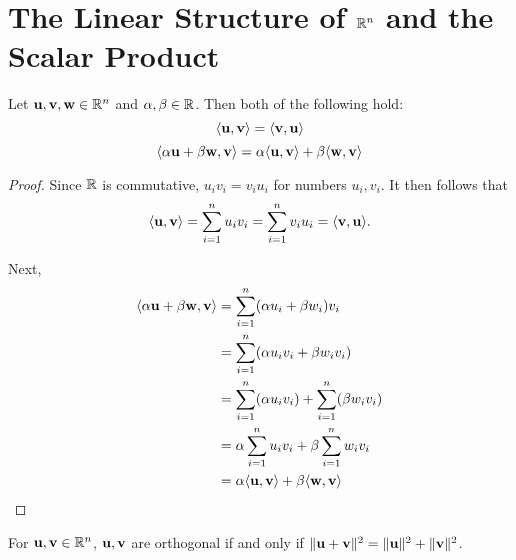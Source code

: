 \documentclass[letterpaper, twoside, 12pt]{book}
\begin{document}
\section{The Linear Structure of \texorpdfstring{$\mathbb R^n$}{Rn}
and the Scalar Product}

\begin{proposition}[10.2]
  Let \(\mathbf u,\mathbf v,\mathbf w\in\mathbb R^n\)
  and \(\alpha,\beta\in\mathbb R\). Then both of the following hold:
  \[
    \langle\mathbf u,\mathbf v\rangle=\langle\mathbf v,\mathbf u\rangle
  \]
  \[
    \langle\alpha\mathbf u+\beta\mathbf w, \mathbf v\rangle
      =
    \alpha\langle\mathbf u,\mathbf v\rangle+\beta\langle\mathbf w,\mathbf v\rangle
  \]
\end{proposition}

\begin{proof}
    Since \(\mathbb R\) is commutative, \(u_i v_i = v_i u_i\) for numbers
    \(u_i, v_i\). It then follows that
    \[ \langle\mathbf u, \mathbf v \rangle = \sum_{i = 1}^n u_i v_i = \sum_{i = 1}^n v_i u_i = \langle\mathbf v, \mathbf u \rangle .\]

    Next,
    \begin{align*} 
        \langle \alpha \mathbf u + \beta \mathbf w, \mathbf v \rangle &= \sum_{i = 1}^n (\alpha u_i + \beta w_i ) v_i \\
                    &= \sum_{i = 1}^n (\alpha u_i v_i + \beta w_i v_i ) \\
                    &= \sum_{i = 1}^n (\alpha u_i v_i) + \sum_{i = 1}^n (\beta w_i v_i) \\
                    &= \alpha \sum_{i = 1}^n u_i v_i + \beta \sum_{i = 1}^n w_i v_i \\
                    &= \alpha \langle \mathbf u, \mathbf v \rangle + \beta \langle \mathbf w, \mathbf v \rangle \\
    \end{align*}
\end{proof}

\begin{lemma}[10.4]
  For \(\mathbf u,\mathbf v\in\mathbb R^n\), \(\mathbf u,\mathbf v\) are
  orthogonal if and only if
  \(\|\mathbf u+\mathbf v\|^2 =\|\mathbf u\|^2+\|\mathbf v\|^2\).
\end{lemma}
\end{document}
